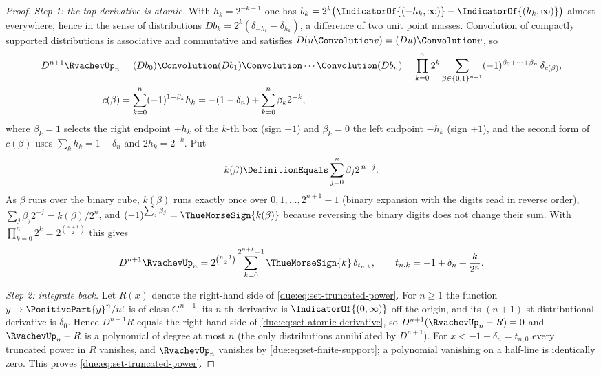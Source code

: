 \documentclass[11pt,oneside]{article}
\theoremstyle{plain}
\theoremstyle{definition}
\theoremstyle{remark}
\newcommand{\upn}[1]{\RvachevUp_{#1}}
\begin{document}
\begin{proof}
\emph{Step 1: the top derivative is atomic.}
With $h_k=2^{-k-1}$ one has
$b_k=2^{k}\bigl(\IndicatorOf{(-h_k,\infty)}-\IndicatorOf{(h_k,\infty)}\bigr)$
almost everywhere, hence in the sense of distributions
$Db_k=2^{k}(\delta_{-h_k}-\delta_{h_k})$, a difference of two unit point
masses.  Convolution of compactly supported distributions is associative and
commutative and satisfies $D(u\Convolution v)=(Du)\Convolution v$, so
\begin{align*}
 D^{n+1}\upn{n}
 &=(Db_0)\Convolution(Db_1)\Convolution\cdots\Convolution(Db_n)
 =\prod_{k=0}^{n}2^{k}\sum_{\beta\in\{0,1\}^{n+1}}
 (-1)^{\beta_0+\cdots+\beta_n}\,\delta_{c(\beta)},\\
 c(\beta)&=\sum_{k=0}^{n}(-1)^{1-\beta_k}h_k
 =-(1-\delta_n)+\sum_{k=0}^{n}\beta_k2^{-k},
\end{align*}
where $\beta_k=1$ selects the right endpoint $+h_k$ of the $k$-th box (sign
$-1$) and $\beta_k=0$ the left endpoint $-h_k$ (sign $+1$), and the second
form of $c(\beta)$ uses $\sum_k h_k=1-\delta_n$ and $2h_k=2^{-k}$.  Put
\[
 k(\beta)\DefinitionEquals\sum_{j=0}^{n}\beta_j2^{\,n-j}.
\]
As $\beta$ runs over the binary cube, $k(\beta)$ runs exactly once over
$0,1,\ldots,2^{n+1}-1$ (binary expansion with the digits read in reverse
order), $\sum_j\beta_j2^{-j}=k(\beta)/2^{n}$, and
$(-1)^{\sum_j\beta_j}=\ThueMorseSign{k(\beta)}$ because reversing the
binary digits does not change their sum.  With
$\prod_{k=0}^{n}2^{k}=2^{\binom{n+1}{2}}$ this gives
\begin{equation}
 D^{n+1}\upn{n}=2^{\binom{n+1}{2}}\sum_{k=0}^{2^{n+1}-1}
 \ThueMorseSign{k}\,\delta_{t_{n,k}},
 \qquad t_{n,k}=-1+\delta_n+\frac{k}{2^{n}} .
 \label{due:eq:set-atomic-derivative}
\end{equation}

\emph{Step 2: integrate back.}
Let $R(x)$ denote the right-hand side of \cref{due:eq:set-truncated-power}.
For $n\ge1$ the function $y\mapsto\PositivePart{y}^{n}/n!$ is of class
$C^{\,n-1}$, its $n$-th derivative is $\IndicatorOf{(0,\infty)}$ off the
origin, and its $(n+1)$-st distributional derivative is $\delta_0$.  Hence
$D^{n+1}R$ equals the right-hand side of
\cref{due:eq:set-atomic-derivative}, so $D^{n+1}(\upn{n}-R)=0$ and
$\upn{n}-R$ is a polynomial of degree at most $n$ (the only distributions
annihilated by $D^{n+1}$).  For $x<-1+\delta_n=t_{n,0}$ every truncated
power in $R$ vanishes, and $\upn{n}$ vanishes by
\cref{due:eq:set-finite-support}; a polynomial vanishing on a half-line is
identically zero.  This proves \cref{due:eq:set-truncated-power}.


\end{proof}
\end{document}
